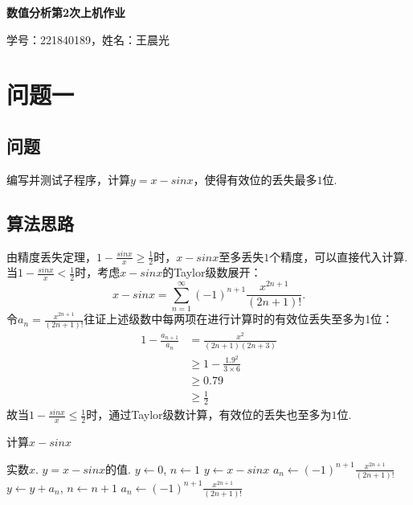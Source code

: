 \documentclass[UTF8,ctexart,a4paper,11pt,openany]{article}
\theoremstyle{definition}
\newcommand\e{\leftarrow}
\begin{document}
\begin{center}
{\huge \textbf{数值分析第2次上机作业}}

{\large 学号：221840189，姓名：王晨光}
\end{center}

\section{问题一}
    \subsection{问题}
    编写并测试子程序，计算$y= x−sin x$，使得有效位的丢失最多$1$位.
    \subsection{算法思路}
    由精度丢失定理，$1-\frac{sinx}{x}\geqslant \frac{1}{2}$时，$x-sinx$至多丢失$1$个精度，可以直接代入计算. 当$1-\frac{sinx}{x}< \frac{1}{2}$时，考虑$x-sinx$的Taylor级数展开：$$x-sinx=\sum_{n = 1}^{\infty} (-1)^{n+1}\frac{x^{2n+1}}{(2n+1)!} .$$ \indent 令$a_n=\frac{x^{2n+1}}{(2n+1)!}$往证上述级数中每两项在进行计算时的有效位丢失至多为1位：$$\begin{aligned} 1-\frac{a_{n+1}}{a_{n}} & =\frac{x^{2}}{(2 n+1)(2 n+3)} \\ & \geqslant 1-\frac{1.9^{2}}{3 \times 6} \\ & \geqslant 0.79 \\ & \geqslant \frac{1}{2}\end{aligned}$$ \indent 故当$1-\frac{sinx}{x}\leqslant \frac{1}{2}$时，通过Taylor级数计算，有效位的丢失也至多为$1$位.
    \begin{algorithm}[H]
        \caption{计算$x-sinx$}
        \begin{algorithmic}[1] %
            \Require 实数$x$.
            \Ensure $y=x-sinx$的值.
                \State $y\e 0$, $n\e 1$
                    \State $y \e x-sinx$
                \Else
                    \State $a_n\e (-1)^{n+1}\frac{x^{2n+1}}{(2n+1)!}$
                        \State $y\e y+a_n$, $n\e n+1$
                        \State $a_n\e (-1)^{n+1}\frac{x^{2n+1}}{(2n+1)!}$
                    \EndWhile
                \EndIf
            \EndFunction
        \end{algorithmic}
    \end{algorithm}
\end{document}
